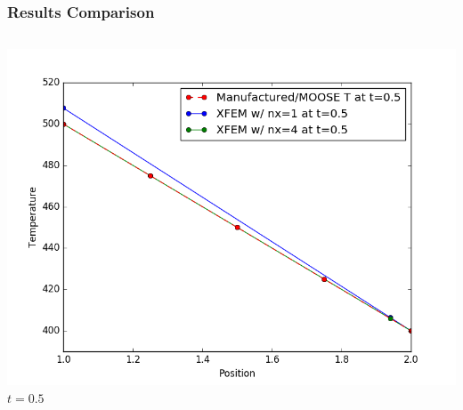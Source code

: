 \documentclass[]{beamer}
\begin{document}
\begin{frame}[t]\frametitle{Results Comparison}
  	\begin{columns}
			\begin{center}
			\includegraphics[scale=0.17]{figures/1D_rz_homog1mat_u_vs_x_05}\\
			$t=0.5$
			
			\null
			

\end{center}
\end{columns}
\end{frame}
\end{document}
